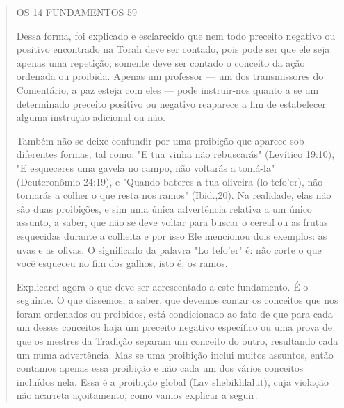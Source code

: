 \begin{quote}
OS 14 FUNDAMENTOS 59

Dessa forma, foi explicado e esclarecido que nem todo preceito ne­gativo
ou positivo encontrado na Torah deve ser contado, pois pode ser que ele
seja apenas uma repetição; somente deve ser contado o conceito da ação
ordenada ou proibida. Apenas um professor --- um dos transmissores do
Co­mentário, a paz esteja com eles --- pode instruir-nos quanto a se um
determina­do preceito positivo ou negativo reaparece a fim de
estabelecer alguma instru­ção adicional ou não.

Também não se deixe confundir por uma proibição que aparece sob
diferentes formas, tal como: "E tua vinha não rebuscarás" (Levítico
19:10), "E esqueceres uma gavela no campo, não voltarás a tomá-la"
(Deuteronômio 24:19), e "Quando bateres a tua oliveira (lo tefo'er), não
tornarás a colher o que resta nos ramos" (Ibid.,20). Na realidade, elas
não são duas proibições, e sim uma única advertência relativa a um único
assunto, a saber, que não se deve voltar para buscar o cereal ou as
frutas esquecidas durante a colheita e por isso Ele mencionou dois
exemplos: as uvas e as olivas. O significado da palavra "Lo te­fo'er" é:
não corte o que você esqueceu no fim dos galhos, isto é, os ramos.

Explicarei agora o que deve ser acrescentado a este fundamento. É o
seguinte. O que dissemos, a saber, que devemos contar os conceitos que
nos foram ordenados ou proibidos, está condicionado ao fato de que para
cada um desses conceitos haja um preceito negativo específico ou uma
prova de que os mestres da Tradição separam um conceito do outro,
resultando cada um nu­ma advertência. Mas se uma proibição inclui muitos
assuntos, então contamos apenas essa proibição e não cada um dos vários
conceitos incluídos nela. Essa é a proibição global (Lav shebikhlalut),
cuja violação não acarreta açoitamento, como vamos explicar a seguir.


\end{quote}
